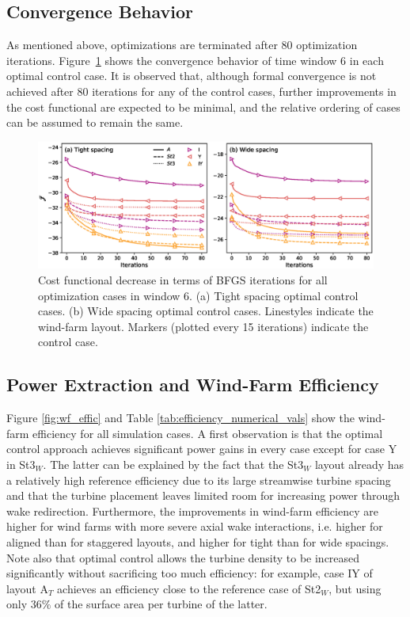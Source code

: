\documentclass[a4paper]{jpconf}
\begin{document}
\subsection{Convergence Behavior}

As mentioned above, optimizations are terminated after 80 optimization iterations. Figure~\ref{fig:convergence} shows the convergence behavior of time window 6 in each optimal control case. It is observed that, although formal convergence is not achieved after 80 iterations for any of the control cases, further improvements in the cost functional are expected to be minimal, and the relative ordering of cases can be assumed to remain the same.

\begin{figure}
	\includegraphics[width=\textwidth]{Torque18/convergence.eps}
	\caption{Cost functional decrease in terms of BFGS iterations for all optimization cases in window 6. (a) Tight spacing optimal control cases. (b) Wide spacing optimal control cases. Linestyles indicate the wind-farm layout. Markers (plotted every 15 iterations) indicate the control case.\label{fig:convergence} }
\end{figure}

\subsection{Power Extraction and Wind-Farm Efficiency}

Figure \ref{fig:wf_effic} and Table \ref{tab:efficiency_numerical_vals} show the wind-farm efficiency for all simulation cases. A first observation is that the optimal control approach achieves significant power gains in every case except for case Y in St3$_W$. The latter can be explained by the fact that the St3$_W$ layout already has a relatively high reference efficiency due to its large streamwise turbine spacing and that the turbine placement leaves limited room for increasing power through wake redirection. Furthermore, the improvements in wind-farm efficiency are higher for wind farms with more severe axial wake interactions, i.e. higher for aligned than for staggered layouts, and higher for tight than for wide spacings. Note also that optimal control allows the turbine density to be increased significantly without sacrificing too much efficiency: for example, case IY of layout A$_T$ achieves an efficiency close to the reference case of St2$_W$, but using only 36$\%$ of the surface area per turbine of the latter. 
\end{document}
